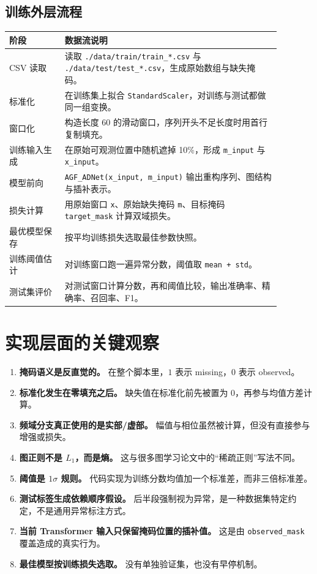 \documentclass[UTF8]{ctexart}
\begin{document}
\subsection{训练外层流程}

\begin{longtable}{>{\raggedright\arraybackslash}p{0.18\linewidth} >{\raggedright\arraybackslash}p{0.70\linewidth}}
\toprule
阶段 & 数据流说明 \\
\midrule
\endhead
CSV 读取 & 读取 \texttt{./data/train/train\_*.csv} 与 \texttt{./data/test/test\_*.csv}，生成原始数组与缺失掩码。 \\
标准化 & 在训练集上拟合 \texttt{StandardScaler}，对训练与测试都做同一组变换。 \\
窗口化 & 构造长度 60 的滑动窗口，序列开头不足长度时用首行复制填充。 \\
训练输入生成 & 在原始可观测位置中随机遮掉 10\%，形成 \texttt{m\_input} 与 \texttt{x\_input}。 \\
模型前向 & \texttt{AGF\_ADNet(x\_input, m\_input)} 输出重构序列、图结构与插补表示。 \\
损失计算 & 用原始窗口 \texttt{x}、原始缺失掩码 \texttt{m}、目标掩码 \texttt{target\_mask} 计算双域损失。 \\
最优模型保存 & 按平均训练损失选取最佳参数快照。 \\
训练阈值估计 & 对训练窗口跑一遍异常分数，阈值取 \texttt{mean + std}。 \\
测试集评价 & 对测试窗口计算分数，再和阈值比较，输出准确率、精确率、召回率、F1。 \\
\bottomrule
\end{longtable}

\section{实现层面的关键观察}

\begin{enumerate}
    \item \textbf{掩码语义是反直觉的。} 在整个脚本里，$1$ 表示 missing，$0$ 表示 observed。
    \item \textbf{标准化发生在零填充之后。} 缺失值在标准化前先被置为 0，再参与均值方差计算。
    \item \textbf{频域分支真正使用的是实部/虚部。} 幅值与相位虽然被计算，但没有直接参与增强或损失。
    \item \textbf{图正则不是 $L_1$，而是熵。} 这与很多图学习论文中的“稀疏正则”写法不同。
    \item \textbf{阈值是 $1\sigma$ 规则。} 代码实现为训练分数均值加一个标准差，而非三倍标准差。
    \item \textbf{测试标签生成依赖顺序假设。} 后半段强制视为异常，是一种数据集特定约定，不是通用异常标注方式。
    \item \textbf{当前 Transformer 输入只保留掩码位置的插补值。} 这是由 \texttt{observed\_mask} 覆盖造成的真实行为。
    \item \textbf{最佳模型按训练损失选取。} 没有单独验证集，也没有早停机制。
\end{enumerate}
\end{document}
